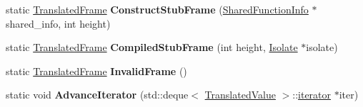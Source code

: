 \begin{DoxyCompactItemize}
\item 
static \hyperlink{classv8_1_1internal_1_1_translated_frame}{Translated\+Frame} {\bfseries Construct\+Stub\+Frame} (\hyperlink{classv8_1_1internal_1_1_shared_function_info}{Shared\+Function\+Info} $\ast$shared\+\_\+info, int height)\hypertarget{classv8_1_1internal_1_1_translated_frame_a7d101e102d1f3fc5ffff0492b15e8472}{}\label{classv8_1_1internal_1_1_translated_frame_a7d101e102d1f3fc5ffff0492b15e8472}

\item 
static \hyperlink{classv8_1_1internal_1_1_translated_frame}{Translated\+Frame} {\bfseries Compiled\+Stub\+Frame} (int height, \hyperlink{classv8_1_1internal_1_1_isolate}{Isolate} $\ast$isolate)\hypertarget{classv8_1_1internal_1_1_translated_frame_a0d60f9ee6c197a2123515e091a9944cd}{}\label{classv8_1_1internal_1_1_translated_frame_a0d60f9ee6c197a2123515e091a9944cd}

\item 
static \hyperlink{classv8_1_1internal_1_1_translated_frame}{Translated\+Frame} {\bfseries Invalid\+Frame} ()\hypertarget{classv8_1_1internal_1_1_translated_frame_a62a04003112f972dd0d13fdfc72c5f9f}{}\label{classv8_1_1internal_1_1_translated_frame_a62a04003112f972dd0d13fdfc72c5f9f}

\item 
static void {\bfseries Advance\+Iterator} (std\+::deque$<$ \hyperlink{classv8_1_1internal_1_1_translated_value}{Translated\+Value} $>$\+::\hyperlink{classv8_1_1internal_1_1_translated_frame_1_1iterator}{iterator} $\ast$iter)\hypertarget{classv8_1_1internal_1_1_translated_frame_af1595da4a664fedf8ff2fbdd7dc96c21}{}\label{classv8_1_1internal_1_1_translated_frame_af1595da4a664fedf8ff2fbdd7dc96c21}

\end{DoxyCompactItemize}
